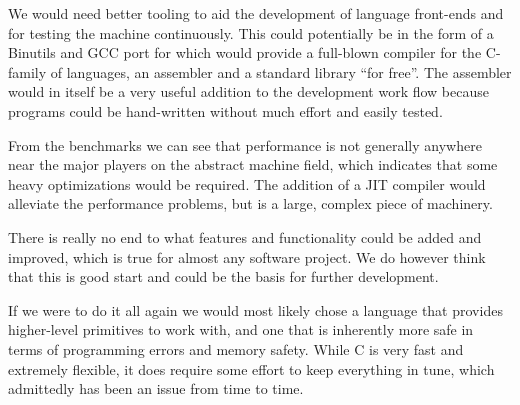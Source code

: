 We would need better tooling to aid the development of language front-ends and
for testing the machine continuously. This could potentially be in the form of a
Binutils and GCC port for \thename{} which would provide a full-blown compiler
for the C-family of languages, an assembler and a standard library ``for
free''. The assembler would in itself be a very useful addition to the
development work flow because programs could be hand-written without much effort
and easily tested.

From the benchmarks we can see that performance is not generally anywhere near
the major players on the abstract machine field, which indicates that some heavy
optimizations would be required. The addition of a JIT compiler would alleviate
the performance problems, but is a large, complex piece of machinery.

There is really no end to what features and functionality could be added and
improved, which is true for almost any software project. We do however think
that this is good start and could be the basis for further development.

If we were to do it all again we would most likely chose a language that
provides higher-level primitives to work with, and one that is inherently more
safe in terms of programming errors and memory safety. While C is very fast and
extremely flexible, it does require some effort to keep everything in tune,
which admittedly has been an issue from time to time.


